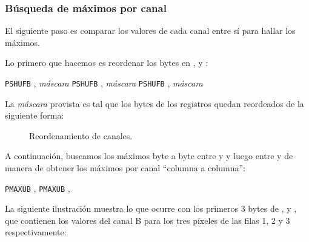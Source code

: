 \subsubsection{Búsqueda de máximos por canal}

El siguiente paso es comparar los valores de cada canal entre sí para hallar los máximos.

Lo primero que hacemos es reordenar los bytes en ,  y :

\begin{pseudocodigo}
    \STATE \texttt{PSHUFB} , \textit{máscara}
    \STATE \texttt{PSHUFB} , \textit{máscara}
    \STATE \texttt{PSHUFB} , \textit{máscara}
\end{pseudocodigo}

La \textit{máscara} provista es tal que los bytes de los registros quedan
reordeados de la siguiente forma:

\begin{figure}[H]
    \centering
    \caption{Reordenamiento de canales.}
\end{figure}

A continuación, buscamos los máximos byte a byte entre  y  y luego entre
 y  de manera de obtener los máximos por canal ``columna a columna'':

\begin{pseudocodigo}
    \STATE \texttt{PMAXUB} , 
    \STATE \texttt{PMAXUB} ,     
\end{pseudocodigo}

La siguiente ilustración muestra lo que ocurre con los primeros 3 bytes de
,  y , que contienen los valores del canal B para los
tres píxeles de las filas 1, 2 y 3 respectivamente:

